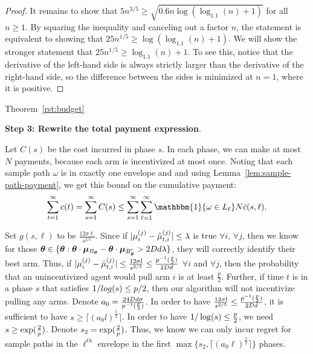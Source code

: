 \begin{proof}
It remains to show that
$5 n^{3/5} \geq \sqrt{0.6n \log(\log_{1.1}(n)+1)}$
for all $n \geq 1$.
By squaring the inequality and canceling out a factor $n$,
the statement is equivalent to showing that
$25 n^{1/5} \geq \log(\log_{1.1}(n)+1)$.
We will show the stronger statement that
$25 n^{1/5} \geq \log_{1.1}(n)+1$.  
To see this, notice that the derivative of the left-hand side is
always strictly larger than the derivative of the right-hand side,
so the difference between the sides is minimized at $n=1$,
where it is positive. 
\end{proof}

\begin{extraproof}{Theorem~\ref{rst:budget}}


\noindent\textbf{Step 3: Rewrite the total payment expression}.

Let $C(s)$ be the cost incurred in phase $s$.
In each phase, we can make at most $N$ payments, because each arm is incentivized at most once.
Noting that each sample path $\omega$ is in exactly one envelope and and using Lemma~\ref{lem:sample-path-payment}, we get
this bound on the cumulative payment:
\begin{align*}
\sum_{t=1}^{\infty}c(t) =\sum_{s=1}^{\infty}C(s)
\leq  \sum_{s=1}^{\infty}\sum_{\ell=1}^{\infty}\mathbbm{1}\{\SP\in \Env{\ell}\} N \bar{c}(s,\ell). 
\end{align*}

Set $g(s,\ell)$ to be $\frac{12\sigma \ell}{s^{2/5}}$.
Since if $|\mu_{i}^{(j)}-\hat{\mu}_{t,i}^{(j)}|\leq \lambda$ is true $\forall i$, $\forall j$, then we know for those $\bm{\theta}\in \{\bm{\theta}:\bm{\theta}\cdot \bm{\mu}_{B_{\bm{\theta}}}-\bm{\theta} \cdot \bm{\mu}_{B'_{\bm{\theta}}}> 2D d\lambda\}$, they will correctly identify their best arm. Thus, if $|\mu_{i}^{(j)}-\hat{\mu}_{t,i}^{(j)}|\leq \frac{12\sigma l}{s^{2/5}} \leq \frac{p^{-1}(\frac{p}{2})}{2D d}$ $\forall i$ and $\forall j$, then the probability that an unincentivized agent would pull arm $i$ is at least $\frac{p}{2}$. Further, if time $t$ is in a phase $s$ that satisfies $1/log(s)\leq p/2$, then our algorithm will not incentivize pulling any arms. Denote $a_0=\frac{24D d\sigma}{p^{-1}(\frac{p}{2})}$. In order to have $\frac{12\sigma l}{s^{2/5}}\leq \frac{p^{-1}(\frac{p}{2})}{2D d}$, it is sufficient to have $s\geq \lceil (a_{0} l)^\frac{5}{2} \rceil$. In order to have $1/\log(s)\leq \frac{p}{2}$, we need $s\geq \exp(\frac{2}{p})$. Denote $s_2=\exp(\frac{2}{p})$. Thus, we know we can only incur regret  for sample paths \SP in the $\ell^{th}$ envelope in the first $\max\{s_2,\lceil (a_0 \ell)^\frac{5}{2} \rceil\}$ phases.


\end{extraproof}
